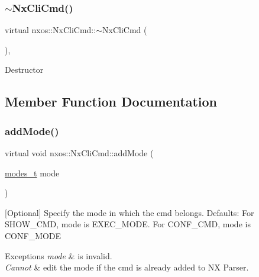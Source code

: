 \subsubsection{\texorpdfstring{$\sim$\+Nx\+Cli\+Cmd()}{~NxCliCmd()}}
{\footnotesize\ttfamily virtual nxos\+::\+Nx\+Cli\+Cmd\+::$\sim$\+Nx\+Cli\+Cmd (\begin{DoxyParamCaption}{ }\end{DoxyParamCaption})\hspace{0.3cm}{\ttfamily [inline]}, {\ttfamily [virtual]}}

Destructor 

\subsection{Member Function Documentation}
\mbox{\label{classnxos_1_1_nx_cli_cmd_a38260da2d6b7a227c4dd027521205c0b}} 
\subsubsection{\texorpdfstring{add\+Mode()}{addMode()}}
{\footnotesize\ttfamily virtual void nxos\+::\+Nx\+Cli\+Cmd\+::add\+Mode (\begin{DoxyParamCaption}\item[{\mbox{\hyperlink{classnxos_1_1_nx_cli_cmd_a72999b2e8f2995bbb19be346d875e3ce}{modes\+\_\+t}}}]{mode }\end{DoxyParamCaption})\hspace{0.3cm}{\ttfamily [pure virtual]}}

\mbox{[}Optional\mbox{]} Specify the mode in which the cmd belongs. Defaults\+: For S\+H\+O\+W\+\_\+\+C\+MD, mode is E\+X\+E\+C\+\_\+\+M\+O\+DE. For C\+O\+N\+F\+\_\+\+C\+MD, mode is C\+O\+N\+F\+\_\+\+M\+O\+DE 
\begin{DoxyExceptions}{Exceptions}
{\em mode} & is invalid. \\
\hline
{\em Cannot} & edit the mode if the cmd is already added to NX Parser. \\
\hline
\end{DoxyExceptions}
\mbox{\label{classnxos_1_1_nx_cli_cmd_ad4ebfd3ce0e68266bbc22bb4bc7dad0b}} 
